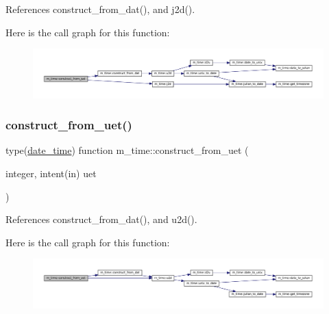 References construct\+\_\+from\+\_\+dat(), and j2d().

Here is the call graph for this function\+:\nopagebreak
\begin{figure}[H]
\begin{center}
\leavevmode
\includegraphics[width=350pt]{namespacem__time_ab7b679d14dabc2a9250f4ec218569f0c_cgraph}
\end{center}
\end{figure}
\mbox{\label{namespacem__time_a7d903e5ff714106d933cee618e780a8b}} 
\subsubsection{\texorpdfstring{construct\+\_\+from\+\_\+uet()}{construct\_from\_uet()}}
{\footnotesize\ttfamily type(\mbox{\hyperlink{structm__time_1_1date__time}{date\+\_\+time}}) function m\+\_\+time\+::construct\+\_\+from\+\_\+uet (\begin{DoxyParamCaption}\item[{integer, intent(in)}]{uet }\end{DoxyParamCaption})\hspace{0.3cm}{\ttfamily [private]}}



References construct\+\_\+from\+\_\+dat(), and u2d().

Here is the call graph for this function\+:\nopagebreak
\begin{figure}[H]
\begin{center}
\leavevmode
\includegraphics[width=350pt]{namespacem__time_a7d903e5ff714106d933cee618e780a8b_cgraph}
\end{center}
\end{figure}
\mbox{\label{namespacem__time_a3fccc53c2650104eff084c7998d18f54}} 
